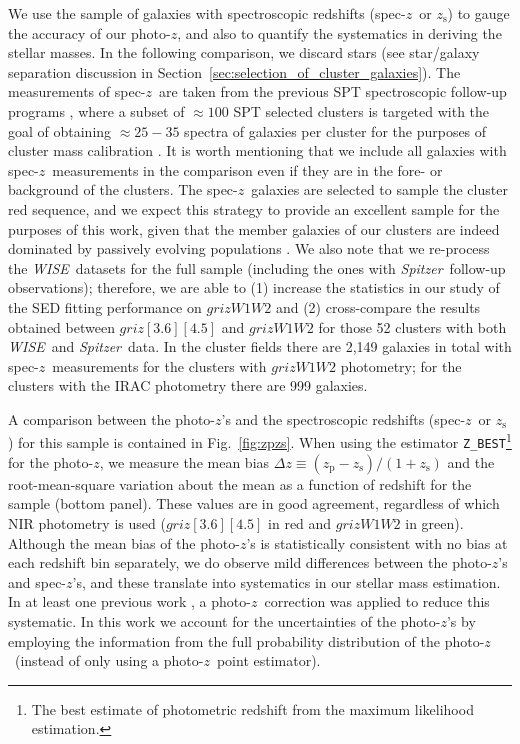 \documentclass[useAMS,usenatbib,iop,numberedappendix]{mn2e}
\newcommand{\redshift}{\ensuremath{z}}
\newcommand{\Spitzer}{\emph{Spitzer}}
\newcommand{\WISE}{\emph{WISE}}
\newcommand{\zp}{\ensuremath{z_{\mathrm{p}}}}
\newcommand{\zs}{\ensuremath{z_{\mathrm{s}}}}
\newcommand{\IRACone}{\ensuremath{[3.6]}}
\newcommand{\IRACtwo}{\ensuremath{[4.5]}}
\newcommand{\Wone}{\ensuremath{W1}}
\newcommand{\Wtwo}{\ensuremath{W2}}
\begin{document}
We use the sample of galaxies with spectroscopic redshifts (spec-\redshift\ or \zs) to gauge the accuracy of our photo-\redshift, and also to quantify the systematics in deriving the stellar masses.  In the following comparison, we discard stars (see star/galaxy separation discussion in Section~\ref{sec:selection_of_cluster_galaxies}).
The measurements of spec-\redshift\ are taken from the previous SPT spectroscopic follow-up programs \citep{ruel14,bayliss16}, where a subset of $\approx100$ SPT selected clusters is targeted with the goal of obtaining $\approx25-35$ spectra of galaxies per cluster for the purposes of cluster mass calibration \citep{saro13,bocquet15}.
It is worth mentioning that we include all galaxies with spec-\redshift\ measurements in the comparison even if they are in the fore- or background of the clusters.
The spec-\redshift\ galaxies are selected to sample the cluster red sequence, and we expect this strategy to provide an excellent sample for the purposes of this work, given that the member galaxies of our clusters are indeed dominated by passively evolving populations \citep{hennig17}.
We also note that we re-process the \WISE\ datasets for the full sample (including the ones with \Spitzer\ follow-up observations); therefore, we are able to (1) increase the statistics in our study of the SED fitting performance on $griz\Wone\Wtwo$ and (2) cross-compare the results obtained between $griz\IRACone\IRACtwo$ and $griz\Wone\Wtwo$ for those 52 clusters with both \WISE\ and \Spitzer\ data. 
In the cluster fields there are 2,149 galaxies in total with spec-\redshift\ measurements for the clusters with $griz\Wone\Wtwo$ photometry; for the clusters with the IRAC photometry there are 999 galaxies. 

A comparison between the photo-\redshift's and the spectroscopic redshifts (spec-\redshift\ or \zs) for this sample is contained in Fig.~\ref{fig:zpzs}.
When using the estimator \texttt{Z\_BEST}\footnote{The best estimate of photometric redshift from the maximum likelihood estimation.} for the photo-\redshift,
we measure the mean bias $\Delta\redshift \equiv \left( \zp - \zs \right) / \left( 1 + \zs \right)$ and the root-mean-square variation about the mean as a function of redshift for the sample (bottom panel).  These values are in good agreement, regardless of which NIR photometry is used ($griz\IRACone\IRACtwo$ in red and $griz\Wone\Wtwo$ in green).
Although the mean bias of the photo-\redshift's is statistically consistent with no bias at each redshift bin separately, we do observe mild differences between the photo-\redshift's and spec-\redshift's, and these translate into systematics in our stellar mass estimation.
In at least one previous work \citep{vdb15}, a photo-\redshift\ correction was applied to reduce this systematic.
In this work we account for the uncertainties of the photo-\redshift's by employing the information from the full probability distribution of the photo-\redshift\ (instead of only using a photo-\redshift\ point estimator). 
\end{document}
